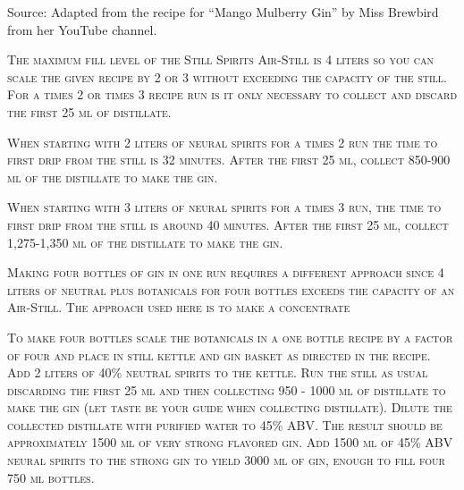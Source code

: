 \documentclass[letterpaper]{recipePMG}
\begin{document}
Source: Adapted from the recipe for ``Mango Mulberry Gin'' by Miss Brewbird from her YouTube channel. 
\newpage



\newpage
{}

\textsc{The maximum fill level of the Still Spirits Air-Still is 4 liters so you can scale the given recipe by 2 or 3 without exceeding the capacity of the still. For a times 2 or times 3 recipe run is it only necessary to collect and discard the first 25 ml of distillate.}  

\textsc{When starting with 2 liters of neural spirits for a times 2 run the time to first drip from the still is 32 minutes. After the first 25 ml, collect 850-900 ml of the distillate to make the gin.}

\textsc{When starting with 3 liters of neural spirits for a times 3 run, the time to first drip from the still is around 40 minutes. After the first 25 ml, collect 1,275-1,350 ml of the distillate to make the gin.}

\newpage
{}
\label{ConcentrationMethod}
\textsc{Making four bottles of gin in one run requires a different approach since 4 liters of neutral plus botanicals for four bottles exceeds the capacity of an Air-Still. The approach used here is to make a concentrate}

\textsc{To make four bottles scale the botanicals in a one bottle recipe by a factor of four and place in still kettle and gin basket as directed in the recipe. Add 2 liters of 40\% neutral spirits to the kettle. Run the still as usual discarding the first 25 ml and then collecting 950 - 1000 ml of distillate to make the gin (let taste be your guide when collecting distillate). Dilute the collected distillate with purified water to 45\% ABV. The result should be approximately 1500 ml of very strong flavored gin. Add 1500 ml of 45\% ABV neural spirits to the strong gin to yield 3000 ml of gin, enough to fill four 750 ml bottles.} 



\newpage
{}
\label{TumericGin}
\end{document}
